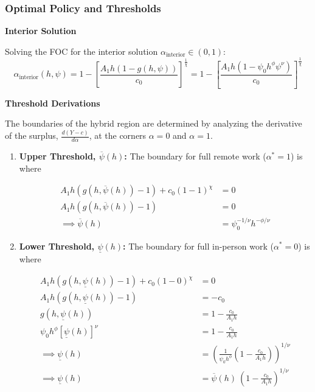 \documentclass[
  11pt,
  letterpaper,
  DIV=11,
  numbers=noendperiod]{scrartcl}
\begin{document}
\subsubsection{Optimal Policy and
Thresholds}\label{optimal-policy-and-thresholds}

\textbf{Interior Solution}

Solving the FOC for the interior solution
\(\alpha_{\text{interior}} \in (0,1)\): \[
\alpha_{\text{interior}}(h, \psi) = 1 - \left[ \frac{A_1 h \left( 1 - g(h, \psi) \right)}{c_0} \right]^{\frac{1}{\chi}} = 1 - \left[ \frac{A_1 h \left( 1 - \psi_0 h^\phi \psi^\nu \right)}{c_0} \right]^{\frac{1}{\chi}}
\]

\textbf{Threshold Derivations}

The boundaries of the hybrid region are determined by analyzing the
derivative of the surplus, \(\frac{d(Y-c)}{d\alpha}\), at the corners
\(\alpha=0\) and \(\alpha=1\).

\begin{enumerate}
\def\labelenumi{\arabic{enumi}.}
\item
  \textbf{Upper Threshold, \(\overline{\psi}(h)\):} The boundary for
  full remote work (\(\alpha^*=1\)) is where

  \begin{align*}
  A_1 h (g(h, \overline{\psi}(h)) - 1) + c_0(1-1)^\chi &= 0 \\
  A_1 h (g(h, \overline{\psi}(h)) - 1) &= 0 \\
  \implies \overline{\psi}(h) &= \psi_0^{-1/\nu} h^{-\phi/\nu}
  \end{align*}
\item
  \textbf{Lower Threshold, \(\underline{\psi}(h)\):} The boundary for
  full in-person work (\(\alpha^*=0\)) is where

  \begin{align*}
  A_1 h (g(h, \underline{\psi}(h)) - 1) + c_0(1-0)^\chi &= 0 \\
  A_1 h (g(h, \underline{\psi}(h)) - 1) &= -c_0 \\
  g(h, \underline{\psi}(h)) &= 1 - \frac{c_0}{A_1 h} \\
  \psi_0 h^\phi [\underline{\psi}(h)]^\nu &= 1 - \frac{c_0}{A_1 h} \\
  \implies \underline{\psi}(h) &= \left( \frac{1}{\psi_0 h^\phi} \left( 1 - \frac{c_0}{A_1 h} \right) \right)^{1/\nu}\\
  \implies \underline{\psi}(h) & = \overline{\psi}(h)\ \left( 1 - \frac{c_0}{A_1 h} \right)^{1/\nu}
  \end{align*}
\end{enumerate}
\end{document}
